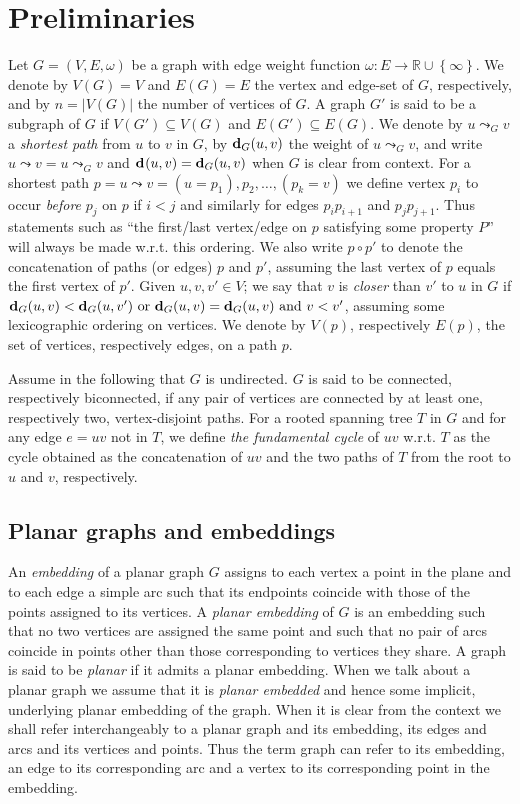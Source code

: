 \documentclass[a4paper,UKenglish,cleveref, autoref, thm-restate]{article}
\newcommand{\dist}[2]{\ensuremath{\normalfont{\textbf{d}}_{#1}({#2})}}
\begin{document}
\section{Preliminaries}\label{sec:defs-notation}
Let $G=(V,E,\omega)$ be a graph with edge weight function $\omega : E \rightarrow \mathbb{R}\cup\left\{ \infty \right\}$. We denote by $V(G) = V$ and $E(G) = E$ the vertex and edge-set of $G$, respectively, and by $n = |V(G)|$ the number of vertices of $G$. A graph $G'$ is said to be a subgraph of $G$ if $V(G') \subseteq V(G)$ and $E(G') \subseteq E(G)$. We denote by $u \leadsto_G v$ a \textit{shortest path} from $u$ to $v$ in $G$, by $\dist{G}{u,v}$ the weight of $u \leadsto_G v$, and write $u \leadsto v = u \leadsto_G v$ and $\dist{}{u,v}=\dist{G}{u,v}$ when $G$ is clear from context. For a shortest path $p = u \leadsto v = (u = p_1),p_2, \hdots, (p_k = v)$ we define vertex $p_i$ to occur \textit{before} $p_j$ on $p$ if $i < j$ and similarly for edges $p_ip_{i+1}$ and $p_{j}p_{j+1}$. Thus statements such as ``the first/last vertex/edge on $p$ satisfying some property $P$'' will always be made w.r.t. this ordering. We also write $p \circ p'$ to denote the concatenation of paths (or edges) $p$ and $p'$, assuming the last vertex of $p$ equals the first vertex of $p'$. Given $u,v,v' \in V$; we say that $v$ is \textit{closer} than $v'$ to $u$ in $G$ if $\dist{G}{u,v} < \dist{G}{u,v'}\text{ or }\dist{G}{u,v} = \dist{G}{u,v}\text{ and }v < v'$, assuming some lexicographic ordering on vertices. We denote by $V(p)$, respectively $E(p)$, the set of vertices, respectively edges, on a path $p$.

Assume in the following that $G$ is undirected. $G$ is said to be connected, respectively biconnected, if any pair of vertices are connected by at least one, respectively two, vertex-disjoint paths. For a rooted spanning tree $T$ in $G$ and for any edge $e = uv$ not in $T$, we define \textit{the fundamental cycle} of $uv$ w.r.t. $T$ as the cycle obtained as the concatenation of $uv$ and the two paths of $T$ from the root to $u$ and $v$, respectively.

\subsection{Planar graphs and embeddings}
An \textit{embedding} of a planar graph $G$ assigns to each vertex a point in the plane and to each edge a simple arc such that its endpoints coincide with those of the points assigned to its vertices. A \textit{planar embedding} of $G$ is an embedding such that no two vertices are assigned the same point and such that no pair of arcs coincide in points other than those corresponding to vertices they share. A graph is said to be \textit{planar} if it admits a planar embedding. When we talk about a planar graph we assume that it is \textit{planar embedded} and hence some implicit, underlying planar embedding of the graph. When it is clear from the context we shall refer interchangeably to a planar graph and its embedding, its edges and arcs and its vertices and points. Thus the term graph can refer to its embedding, an edge to its corresponding arc and a vertex to its corresponding point in the embedding. 
\end{document}

